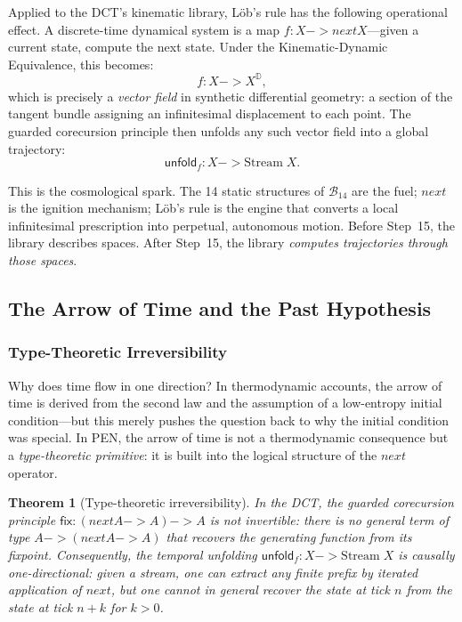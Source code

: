 \documentclass[11pt,a4paper]{article}
\def\to{->}%
\def\bigcirc{next}%
\theoremstyle{plain}
\newtheorem{theorem}{Theorem}[section]
\theoremstyle{definition}
\theoremstyle{remark}
\newcommand{\D}{\mathbb{D}}
\newcommand{\B}{\mathcal{B}}
\begin{document}
Applied to the DCT's kinematic library, L\"{o}b's rule has the following operational effect.  A discrete-time dynamical system is a map $f : X \to \bigcirc X$---given a current state, compute the next state.  Under the Kinematic-Dynamic Equivalence, this becomes:
\begin{equation}
\label{eq:vectorfield}
f : X \to X^{\D},
\end{equation}
which is precisely a \emph{vector field} in synthetic differential geometry: a section of the tangent bundle assigning an infinitesimal displacement to each point.  The guarded corecursion principle then unfolds any such vector field into a global trajectory:
\begin{equation}
\label{eq:unfold}
\mathsf{unfold}_f : X \to \mathrm{Stream}\; X.
\end{equation}

This is the cosmological spark.  The 14 static structures of $\B_{14}$ are the fuel; $\bigcirc$ is the ignition mechanism; L\"{o}b's rule is the engine that converts a local infinitesimal prescription into perpetual, autonomous motion.  Before Step~15, the library describes spaces.  After Step~15, the library \emph{computes trajectories through those spaces}.


\subsection{The Arrow of Time and the Past Hypothesis}
\label{sec:arrow}

\subsubsection{Type-Theoretic Irreversibility}

Why does time flow in one direction?  In thermodynamic accounts, the arrow of time is derived from the second law and the assumption of a low-entropy initial condition---but this merely pushes the question back to why the initial condition was special.  In PEN, the arrow of time is not a thermodynamic consequence but a \emph{type-theoretic primitive}: it is built into the logical structure of the $\bigcirc$ operator.

\begin{theorem}[Type-theoretic irreversibility]
\label{thm:irreversibility}
In the DCT, the guarded corecursion principle $\mathsf{fix} : (\bigcirc A \to A) \to A$ is not invertible: there is no general term of type $A \to (\bigcirc A \to A)$ that recovers the generating function from its fixpoint.  Consequently, the temporal unfolding $\mathsf{unfold}_f : X \to \mathrm{Stream}\; X$ is causally one-directional: given a stream, one can extract any finite prefix by iterated application of $\bigcirc$, but one cannot in general recover the state at tick $n$ from the state at tick $n + k$ for $k > 0$.
\end{theorem}
\end{document}
